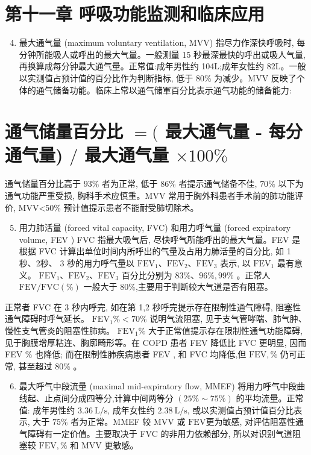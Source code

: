 \documentclass[10pt]{article}
\begin{document}
\section*{第十一章 呼吸功能监测和临床应用}
\begin{enumerate}
  \setcounter{enumi}{3}
  \item 最大通气量 (maximum voluntary ventilation, MVV) 指尽力作深快呼吸时, 每分钟所能吸人或呼出的最大气量。一般测量 15 秒最深最快的呼出或吸人气量, 再换算成每分钟最大通气量。正常值:成年男性约 104L;成年女性约 82L。一般以实测值占预计值的百分比作为判断指标, 低于 $80 \%$ 为减少。MVV 反映了个体的通气储备功能。临床上常以通气储軍百分比表示通气功能的储备能力:
\end{enumerate}

\section*{通气储量百分比 $=($ 最大通气量 - 每分通气量) $/$ 最大通气量 $\times 100 \%$}
通气储量百分比高于 $93 \%$ 者为正常, 低于 $86 \%$ 者提示通气储备不佳, $70 \%$ 以下为通气功能严重受损, 胸科手术应慎重。MVV 常用于胸外科患者手术前的肺功能评价, MVV<50\% 预计值提示患者不能耐受肺切除术。

\begin{enumerate}
  \setcounter{enumi}{4}
  \item 用力肺活量 (forced vital capacity, FVC) 和用力呼气量 (forced expiratory volume, FEV ) FVC 指最大吸气后, 尽快呼气所能呼出的最大气量。FEV 是根据 FVC 计算出单位时间内所呼出的气量及占用力肺活量的百分比, 如 1 秒、2秒、 3 秒的用力呼气量以 $\mathrm{FEV}_{1} 、 \mathrm{FEV}_{2} 、 \mathrm{FEV}_{3}$ 表示, 以 $\mathrm{FEV}_{1}$ 最有意义。 $\mathrm{FEV}_{1} 、 \mathrm{FEV}_{2} 、 \mathrm{FEV}_{3}$ 百分比分别为 $83 \% 、 96 \%, 99 \%$ 。正常人 $\mathrm{FEV} / \mathrm{FVC}(\%)$ 一般大于 $80 \%$,主要用于判断较大气道是否有阻塞。
\end{enumerate}

正常者 FVC 在 3 秒内呼完, 如在第 1,2 秒呼完提示存在限制性通气障碍, 阻塞性通气障碍时呼气延长。 $\mathrm{FEV}_{1} \%<70 \%$ 说明气流阻塞, 见于支气管哮喘、肺气肿、慢性支气管炎的阻塞性肺病。 $\mathrm{FEV}_{1} \%$ 大于正常值提示存在限制性通气功能障碍, 见于胸膜增厚粘连、胸廓畸形等。在 COPD 患者 FEV 降低比 FVC 更明显, 因而 FEV $\%$ 也降低; 而在限制性肺疾病患者 FEV , 和 FVC 均降低,但 $\mathrm{FEV}, \%$ 仍可正常, 甚至超过 $80 \%$ 。

\begin{enumerate}
  \setcounter{enumi}{5}
  \item 最大呼气中段流量 (maximal mid-expiratory flow, MMEF) 将用力呼气中段曲线起、止点间分成四等分,计算中间两等分 $(25 \% \sim 75 \%)$ 的平均流量。正常值: 成年男性约 $3.36 \mathrm{~L} / \mathrm{s}$, 成年女性约 $2.38 \mathrm{~L} / \mathrm{s}$, 或以实测值占预计值百分比表示, 大于 $75 \%$ 者为正常。MMEF 较 MVV 或 $\mathrm{FEV}$更为敏感, 对评估阻塞性通气障碍有一定价值。主要取决于 FVC 的非用力依赖部分, 所以对识别气道阻塞较 $\mathrm{FEV}, \%$ 和 MVV 更敏感。
\end{enumerate}
\end{document}
